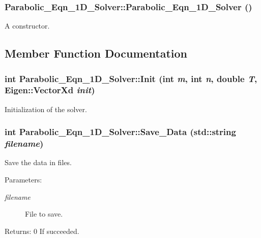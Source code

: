 \subsubsection{\setlength{\rightskip}{0pt plus 5cm}Parabolic\_\-Eqn\_\-1D\_\-Solver::Parabolic\_\-Eqn\_\-1D\_\-Solver ()}\label{classParabolic__Eqn__1D__Solver_002af159849379ce47a90a4c65d64ee8}


A constructor. 

\subsection{Member Function Documentation}
\subsubsection{\setlength{\rightskip}{0pt plus 5cm}int Parabolic\_\-Eqn\_\-1D\_\-Solver::Init (int {\em m}, int {\em n}, double {\em T}, Eigen::Vector\-Xd {\em init})}\label{classParabolic__Eqn__1D__Solver_de582ec62b9366cfe030c8d86f1f067d}


Initialization of the solver. 
\subsubsection{\setlength{\rightskip}{0pt plus 5cm}int Parabolic\_\-Eqn\_\-1D\_\-Solver::Save\_\-Data (std::string {\em filename})}\label{classParabolic__Eqn__1D__Solver_4cb491a13d1502a48e6d3f0f56a4b644}


Save the data in files. \begin{Desc}
\item[Parameters:]
\begin{description}
\item[{\em filename}]File to save. \end{description}
\end{Desc}
\begin{Desc}
\item[Returns:]0 If succeeded. \end{Desc}
